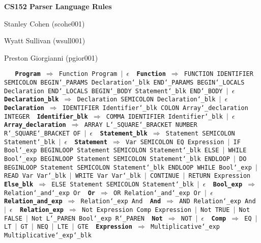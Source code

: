 \documentclass{article}
\begin{document}
 
 
\centerline{\large \bf CS152 Parser Language Rules}
\centerline{Stanley Cohen (scohe001)}
\centerline{Wyatt Sullivan (wsull001)}
\centerline{Preston Giorgianni (pgior001)}

\texttt{
\
{\vskip 0.1in \noindent\bf Program} $\Rightarrow$ 
        Function Program $|$ $\epsilon$
{\vskip 0.1in \noindent\bf Function} $\Rightarrow$ 
        FUNCTION IDENTIFIER SEMICOLON BEGIN\char`_PARAMS Declaration\char`_blk 
        END\char`_PARAMS BEGIN\char`_LOCALS Declaration END\char`_LOCALS BEGIN\char`_BODY 
        Statement\char`_blk END\char`_BODY $|$ $\epsilon$
\
{\vskip 0.1in \noindent\bf Declaration\_blk} $\Rightarrow$ 
    Declaration SEMICOLON Declaration\char`_blk $|$ $\epsilon$
{\vskip 0.1in \noindent\bf Declaration} $\Rightarrow$ 
    IDENTIFIER Identifier\char`_blk COLON Array\char`_declaration INTEGER
{\vskip 0.1in \noindent\bf Identifier\_blk} $\Rightarrow$ 
    COMMA IDENTIFIER Identifier\char`_blk $|$ $\epsilon$
{\vskip 0.1in \noindent\bf Array\_declaration} $\Rightarrow$ 
    ARRAY L\char`_SQUARE\char`_BRACKET NUMBER R\char`_SQUARE\char`_BRACKET OF $|$ $\epsilon$
{\vskip 0.1in \noindent\bf Statement\_blk} $\Rightarrow$ 
    Statement SEMICOLON Statement\char`_blk $|$ $\epsilon$
{\vskip 0.1in \noindent\bf Statement} $\Rightarrow$ 
    Var SEMICOLON EQ Expression $|$ IF Bool\char`_exp BEGINLOOP Statement SEMICOLON Statement\char`_blk ELSE $|$ WHILE Bool\char`_exp BEGINLOOP Statement SEMICOLON Statement\char`_blk ENDLOOP $|$ DO BEGINLOOP Statement SEMICOLON Statement\char`_blk ENDLOOP WHILE Bool\char`_exp $|$ READ Var Var\char`_blk $|$ WRITE Var Var\char`_blk $|$ CONTINUE $|$ RETURN Expression
{\vskip 0.1in \noindent\bf Else\_blk} $\Rightarrow$ 
    ELSE Statement SEMICOLON Statement\char`_blk $|$ $\epsilon$
{\vskip 0.1in \noindent\bf Bool\_exp} $\Rightarrow$ 
    Relation\char`_and\char`_exp Or
{\vskip 0.1in \noindent\bf Or} $\Rightarrow$ 
    OR Relation\char`_and\char`_exp Or $|$ $\epsilon$
{\vskip 0.1in \noindent\bf Relation\_and\_exp} $\Rightarrow$ 
    Relation\char`_exp And
{\vskip 0.1in \noindent\bf And} $\Rightarrow$ 
    AND Relation\char`_exp And $|$ $\epsilon$
{\vskip 0.1in \noindent\bf Relation\_exp} $\Rightarrow$ 
    Not Expression Comp Expression $|$ Not TRUE $|$ Not FALSE $|$ Not L\char`_PAREN Bool\char`_exp R\char`_PAREN
{\vskip 0.1in \noindent\bf Not} $\Rightarrow$ 
    NOT $|$ $\epsilon$
{\vskip 0.1in \noindent\bf Comp} $\Rightarrow$ 
    EQ $|$ LT $|$ GT $|$ NEQ $|$ LTE $|$ GTE
{\vskip 0.1in \noindent\bf Expression} $\Rightarrow$ 
    Multiplicative\char`_exp Multiplicative\char`_exp\char`_blk
}
\end{document}
